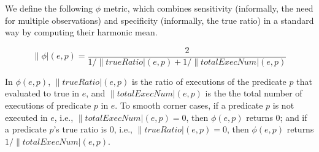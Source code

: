 % 
% 
% 
% 

We define the following
$\phi$ metric, which
combines sensitivity (informally, the need for multiple observations) and
specificity (informally, the true ratio) in a standard way by computing their
harmonic mean.

\vspace{-3mm}

{\small{
\[
\|\phi|(e, p) = \frac{2}{{1}/{\|trueRatio|(e, p)} + {1}/{\|totalExecNum|(e, p)}}
\]
}}

\vspace{-3mm}

In $\phi(e, p)$, $\|trueRatio|(e, p)$ is the ratio of executions of the predicate $p$ that
evaluated to true in $e$, and $\|totalExecNum|(e, p)$ is the the total
number of executions of predicate $p$ in $e$.
To smooth corner cases, if a predicate $p$ is not executed in $e$, i.e., 
$\|totalExecNum|(e, p) = 0$, then $\phi(e, p)$ returns 0; and if a predicate $p$'s true ratio is 0, i.e., $\|trueRatio|(e, p) = 0$, then $\phi(e, p)$ returns
$1/\|totalExecNum|(e, p)$.


